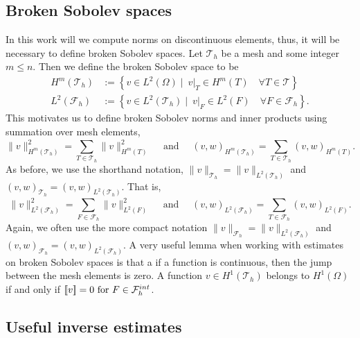 \subsection{Broken Sobolev spaces}%
\label{sub:broken_sobolev_spaces}

In this work will we compute norms on discontinuous elements, thus, it will be necessary to define broken Sobolev spaces.
Let $\mathcal{T}_{h} $ be a mesh and some integer $m\le n$. Then we define the broken Sobolev space to be \[
    \begin{split}
H^{m}( \mathcal{T}_{h} ) & := \left\{ v \in L^2( \Omega )  \mid \ v|_{T} \in H^{m}( T) \quad     \forall T \in  \mathcal{T} \right\}\\
        L^{2}( \mathcal{F}_{h} ) &:= \left\{ v \in L^2( \mathcal{T}_{h}  )  \mid   \ v|_{F} \in L^{2}( F)  \quad  \forall F \in  \mathcal{F}_{h}   \right\}.
    \end{split}
\]
This motivates us to define broken Sobolev norms and inner products using summation over mesh elements,
\[
 \| v \|_{H^{m}( \mathcal{T}_{h} ) }^{2} = \sum_{T \in  \mathcal{T}_{h} }^{} \| v  \|_{ H^{m}( T ) }^{2  } \quad \text{ and } \quad
 (v ,w )_{H^{m}( \mathcal{T}_{h} ) }^{} = \sum_{T \in \mathcal{T} _{h}}^{} (v ,w )_{ H^{m}( T ) }^{  } .
\]
As before, we use the shorthand notation,  $\| v \|_{\mathcal{T}_{h}} =  \| v \|_{L^{2}( \mathcal{T}_{h} ) }$ and  $(v ,w )_{ \mathcal{T}_{h} }^{} = (v ,w )_{L^2( \mathcal{T}_{h} ) }^{} $.
That is,
\[
 \| v \|_{L^{2}( \mathcal{F}_{h} ) }^{2} = \sum_{F \in  \mathcal{F}_{h} }^{} \| v  \|_{ L^{2}( F ) }^{2  } \quad \text{ and } \quad
 (v ,w )_{L^{2}( \mathcal{F}_{h} ) }^{} = \sum_{T \in \mathcal{F} _{h}}^{} (v ,w )_{ L^{2}( F ) }^{  } .
\]
Again, we often use the more compact notation $\| v \|_{\mathcal{F}_{h}} =  \| v \|_{L^{2}( \mathcal{F}_{h} ) }$ and  $(v ,w )_{ \mathcal{F}_{h} }^{} = (v ,w )_{L^2( \mathcal{F}_{h} ) }^{} $.
A very useful lemma when working with estimates on broken Sobolev spaces is that a if a function is continuous, then the jump between the mesh elements is zero. A function $ v \in  H^{1}( \mathcal{T}_{h} ) $ belongs to $ H^{1}( \Omega )  $ if and only
if $ \left[\!\left[  v  \right]\!\right]   = 0 \text{ for }  F \in \mathcal{F}^{int}_{h}$.



\subsection{Useful inverse estimates}%
\label{sub:useful_inverse_estimates}


